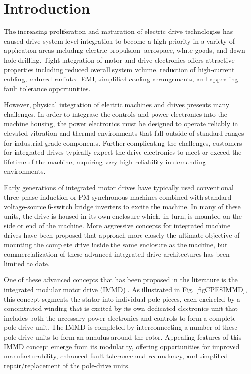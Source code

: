 \chapter{Introduction}
The increasing proliferation and maturation of electric drive technologies has
caused drive system-level integration to become a high priority in a variety
of application areas including electric propulsion, aerospace, white goods,
and down-hole drilling.
Tight integration of motor and drive electronics
offers attractive properties including reduced overall system volume,
reduction of high-current cabling, reduced radiated EMI, simplified cooling
arrangements, and appealing fault tolerance opportunities.

However, physical integration of electric machines and drives presents many
challenges.
In order to integrate the controls and power electronics into the
machine housing, the power electronics must be designed to operate reliably in
elevated vibration and thermal environments that fall outside of standard
ranges for industrial-grade components.
Further complicating the
challenges, customers for integrated drives typically expect the drive
electronics to meet or exceed the lifetime of the machine, requiring very high
reliability in demanding environments.

Early generations of integrated motor drives have typically used conventional
three-phase induction or PM synchronous machines combined with standard
voltage-source 6-switch bridge inverters to excite the machine.
In many of these units, the drive is housed in its own enclosure which, in
turn, is mounted on the side or end of the machine.
More aggressive concepts for integrated machine drives have been proposed that
approach more closely the ultimate objective of mounting the complete drive
inside the same enclosure as the machine, but commercialization of these
advanced integrated drive architectures has been limited to date.

One of these advanced concepts that has been proposed in the literature is the
integrated modular motor drive (IMMD) .
As illustrated in Fig. \ref{figCPESIMMD}, this
concept segments the stator into individual pole pieces, each encircled by a
concentrated winding that is excited by its own dedicated electronics unit
that includes both the necessary power electronics and controls to form a
complete pole-drive unit.
The IMMD is completed by interconnecting a number
of these pole-drive units to form an annulus around the rotor.
Appealing features of this IMMD concept emerge from its modularity, offering
opportunities for improved manufacturability, enhanced fault tolerance and
redundancy, and simplified repair/replacement of the pole-drive units.

